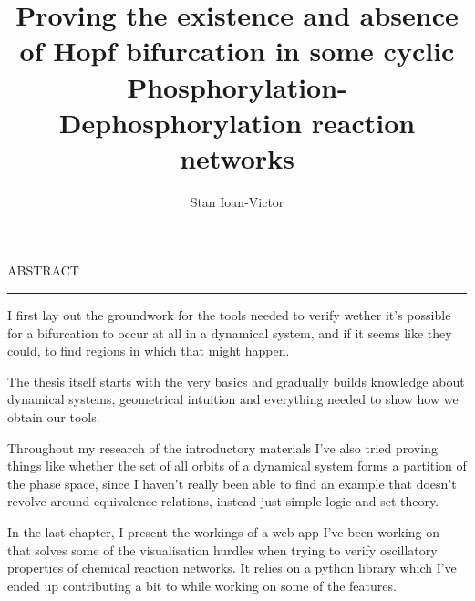 \documentclass[12pt]{report}
\begin{document}
\theoremstyle{definition}
\newtheorem{theorem}{}
\newtheorem{corollary}[theorem]{Corollary}
\theoremstyle{definition}
\newtheorem{definition}{Definition}
\newtheorem{lemma}{Lemma}
\newtheorem{proposition}{Proposition}

\title{Proving the existence and absence of Hopf bifurcation in some cyclic Phosphorylation-Dephosphorylation reaction networks	}
\author{Stan Ioan-Victor}

\maketitle

\newpage
\thispagestyle{empty}
\mbox{}
\newpage
{}

\cleardoublepage
ABSTRACT
\vspace{0.5cm}
\hrule
\vspace{0.5cm}

I first lay out the groundwork for the tools needed to verify wether it's possible for a bifurcation to occur at all in a dynamical system, and if it seems like they could, to find regions in which that might happen.

The thesis itself starts with the very basics and gradually builds knowledge about dynamical systems, geometrical intuition and everything needed to show how we obtain our tools.

Throughout my research of the introductory materials I've also tried proving things like whether the set of all orbits of a dynamical system forms a partition of the phase space, since I haven't really been able to find an example that doesn't revolve around equivalence relations, instead just simple logic and set theory.

In the last chapter, I present the workings of a web-app I've been working on that solves some of the visualisation hurdles when trying to verify oscillatory properties of chemical reaction networks. It relies on a python library which I've ended up contributing a bit to while working on some of the features.

\tableofcontents

\newpage
{}










\printbibliography
\end{document}
